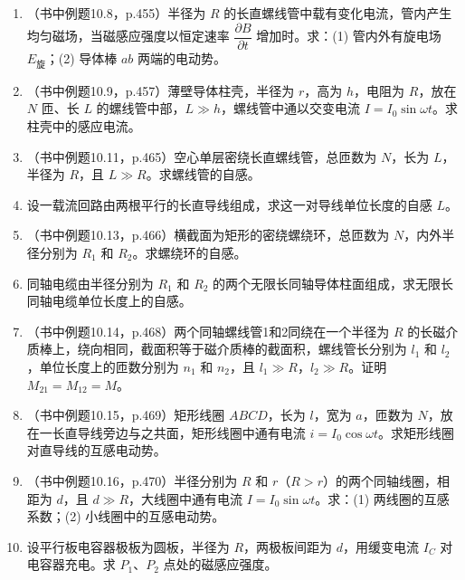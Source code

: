 \documentclass{ctexart}
\begin{document}
\begin{enumerate}
\item（书中例题10.8，p.455）半径为 $R$ 的长直螺线管中载有变化电流，管内产生均匀磁场，当磁感应强度以恒定速率 $\dfrac{\partial B}{\partial t}$ 增加时。求：(1) 管内外有旋电场 $E_{\text{旋}}$；(2) 导体棒 $ab$ 两端的电动势。

\item（书中例题10.9，p.457）薄壁导体柱壳，半径为 $r$，高为 $h$，电阻为 $R$，放在 $N$ 匝、长 $L$ 的螺线管中部，$L \gg h$，螺线管中通以交变电流 $I = I_0\sin\omega t$。求柱壳中的感应电流。

\item（书中例题10.11，p.465）空心单层密绕长直螺线管，总匝数为 $N$，长为 $L$，半径为 $R$，且 $L \gg R$。求螺线管的自感。

\item 设一载流回路由两根平行的长直导线组成，求这一对导线单位长度的自感 $L$。

\item（书中例题10.13，p.466）横截面为矩形的密绕螺绕环，总匝数为 $N$，内外半径分别为 $R_1$ 和 $R_2$。求螺绕环的自感。

\item 同轴电缆由半径分别为 $R_1$ 和 $R_2$ 的两个无限长同轴导体柱面组成，求无限长同轴电缆单位长度上的自感。

\item（书中例题10.14，p.468）两个同轴螺线管1和2同绕在一个半径为 $R$ 的长磁介质棒上，绕向相同，截面积等于磁介质棒的截面积，螺线管长分别为 $l_1$ 和 $l_2$，单位长度上的匝数分别为 $n_1$ 和 $n_2$，且 $l_1 \gg R$，$l_2 \gg R$。证明 $M_{21} = M_{12} = M$。

\item（书中例题10.15，p.469）矩形线圈 $ABCD$，长为 $l$，宽为 $a$，匝数为 $N$，放在一长直导线旁边与之共面，矩形线圈中通有电流 $i = I_0\cos\omega t$。求矩形线圈对直导线的互感电动势。

\item（书中例题10.16，p.470）半径分别为 $R$ 和 $r$（$R > r$）的两个同轴线圈，相距为 $d$，且 $d \gg R$，大线圈中通有电流 $I = I_0\sin\omega t$。求：(1) 两线圈的互感系数；(2) 小线圈中的互感电动势。

\item 设平行板电容器极板为圆板，半径为 $R$，两极板间距为 $d$，用缓变电流 $I_C$ 对电容器充电。求 $P_1$、$P_2$ 点处的磁感应强度。

\end{enumerate}
\end{document}
